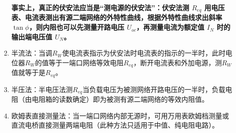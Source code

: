\documentclass[dvipsnames, svgnames,a4paper,11pt]{article}
\begin{document}
\begin{enumerate}
\begin{enumerate}
			\begin{figure}[htbp]
				\centering
				\quad
				\quad
				\label{fig:graph1-5}
			\end{figure}

			
			\textbf{事实上，真正的伏安法应当是“测电源的伏安法”：伏安法测 \( R_{eq} \) 用电压表、电流表测出有源二端网络的外特性曲线，根据外特性曲线求出斜率 \( \tan \phi \)，则内阻也可以先测量开路电压 \( U_{oc} \)，再测量电流为额定值 \( I_N \) 时的输出端电压值 \( U_N \)。}
			
			\item 半流法：当调$R_W$使电流表指示为伏安法时电流表的指示的一半时，此时电位器$R_W$的值等于一端口网络等效电阻$R_{eq}$，断开电流表和外加电源，测$R_W$值就等于是$R_{eq}$。
			

			\item 半压法：半电压法测$R_{eq}$当负载电压为被测网络开路电压的一半时，负载电阻（由电阻箱的读数确定）即为被测有源二端网络的等效内阻值。
			
			\begin{figure}[htbp]
				\centering
				\quad
				\quad
				\label{fig:graph1-5}
			\end{figure}


			\item 欧姆表直接测量法：当一端口网络内部无源时，可用万用表欧姆档测量或直流电桥直接测量两端电阻（此种方法只适用于中值、纯电阻电路）。
			

\end{enumerate}
\end{enumerate}
\end{document}
